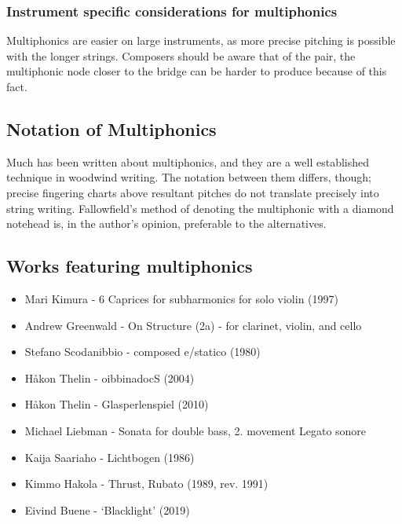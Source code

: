 \subsubsection{Instrument specific considerations for multiphonics}
Multiphonics are easier on large instruments, as more precise pitching is possible with the longer strings.
Composers should be aware that of the pair, the multiphonic node closer to the bridge can be harder to produce because of this fact.

\subsection{Notation of Multiphonics} \label{sec:notation-multiphonics}
Much has been written about multiphonics, and they are a well established technique in woodwind writing.
The notation between them differs, though; precise fingering charts above resultant pitches do not translate precisely into string writing.
Fallowfield's method of denoting the multiphonic with a diamond notehead is, in the author's opinion, preferable to the alternatives.


\subsection{Works featuring multiphonics} \label{sec:multiphonicsLiterature}

\begin{itemize}
    \item Mari Kimura - 6 Caprices for subharmonics for solo violin (1997) 
    \item Andrew Greenwald - On Structure (2a) - for clarinet, violin, and cello
    \item Stefano Scodanibbio - composed e/statico (1980)
    \item Håkon Thelin - oibbinadocS (2004)
    \item Håkon Thelin - Glasperlenspiel (2010)
    \item Michael Liebman - Sonata for double bass, 2. movement Legato sonore
    \item Kaija Saariaho - Lichtbogen (1986)
    \item Kimmo Hakola - Thrust, Rubato (1989, rev. 1991) 
    \item Eivind Buene - `Blacklight' (2019)
\end{itemize}

